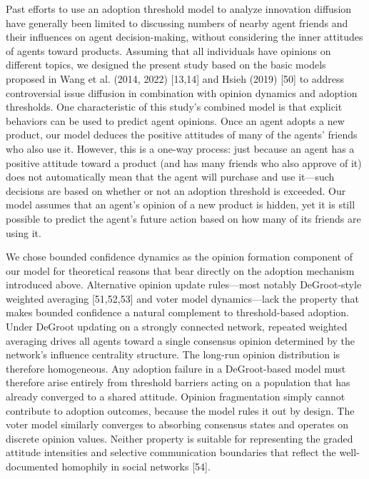 \documentclass[10pt,letterpaper]{article}
\begin{document}
Past efforts to use an adoption threshold model to analyze innovation diffusion have generally been limited to discussing numbers of nearby agent friends and their influences on agent decision-making, without considering the inner attitudes of agents toward products. Assuming that all individuals have opinions on different topics, we designed the present study based on the basic models proposed in Wang et al. (2014, 2022) [13,14] and Hsieh (2019) [50] to address controversial issue diffusion in combination with opinion dynamics and adoption thresholds. One characteristic of this study's combined model is that explicit behaviors can be used to predict agent opinions. Once an agent adopts a new product, our model deduces the positive attitudes of many of the agents' friends who also use it. However, this is a one-way process: just because an agent has a positive attitude toward a product (and has many friends who also approve of it) does not automatically mean that the agent will purchase and use it---such decisions are based on whether or not an adoption threshold is exceeded. Our model assumes that an agent's opinion of a new product is hidden, yet it is still possible to predict the agent's future action based on how many of its friends are using it.

We chose bounded confidence dynamics as the opinion formation component of our model for theoretical reasons that bear directly on the adoption mechanism introduced above. Alternative opinion update rules---most notably DeGroot-style weighted averaging [51,52,53] and voter model dynamics---lack the property that makes bounded confidence a natural complement to threshold-based adoption. Under DeGroot updating on a strongly connected network, repeated weighted averaging drives all agents toward a single consensus opinion determined by the network's influence centrality structure. The long-run opinion distribution is therefore homogeneous. Any adoption failure in a DeGroot-based model must therefore arise entirely from threshold barriers acting on a population that has already converged to a shared attitude. Opinion fragmentation simply cannot contribute to adoption outcomes, because the model rules it out by design. The voter model similarly converges to absorbing consensus states and operates on discrete opinion values. Neither property is suitable for representing the graded attitude intensities and selective communication boundaries that reflect the well-documented homophily in social networks [54].
\end{document}
